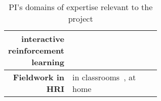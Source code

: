\begin{table}[h]
\begin{tabular}{rp{0.6\linewidth}}
        interactive reinforcement learning & \small \cite{senft2017leveraging,senft2017supervised, senft2019teaching} \\
        \midrule
        \textbf{Fieldwork in HRI} & \small in
        classrooms~\cite{hood2015when, lemaignan2016learning, jacq2016building,
        baxter2015wider,kennedy2016cautious,senft2018robots}, at home~\cite{mondada2015ranger}\\
        \bottomrule
    \end{tabular}
    \caption{\small PI's domains of expertise relevant to the \project project}
    \label{pi-expertise}
\end{table}



\newpage

\printbibliography




